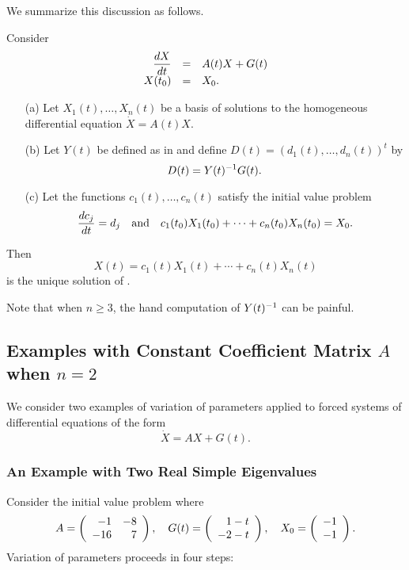 \documentclass{ximera}
\begin{document}
We summarize this discussion as follows. 
\begin{thm} \label{thm:varparsys}
Consider 
\begin{equation}  \label{eq:VPS}
\begin{array}{rcl}
\displaystyle \frac{dX}{dt} & = & A(t)X+G(t)\\
X(t_0) & = & X_0.
\end{array}
\end{equation}
\begin{itemize}
\item[(a)]  Let $X_1(t),\ldots,X_n(t)$ be a 
basis of solutions to 
the homogeneous differential equation $\dot{X}=A(t)X$.  
\item[(b)]  Let $Y(t)$ be defined as in  and define 
$D(t)=(d_1(t),\ldots,d_n(t))^t$ by 
\begin{equation}  \label{e:D(t)}
D(t) = Y(t)^{-1} G(t).
\end{equation}
\item[(c)]  Let the functions $c_1(t),\ldots,c_n(t)$ satisfy the initial 
value problem 
\begin{equation}  \label{eq:cj0}
\frac{dc_j}{dt}=d_j \quad\mbox{and}\quad  c_1(t_0)X_1(t_0) + \cdots +c_n(t_0)X_n(t_0) = X_0.
\end{equation}
\end{itemize}
Then
\[
X(t) =  c_1(t)X_1(t) + \cdots + c_n(t)X_n(t)
\]
is the unique solution of .
\end{thm}

Note that when $n\ge 3$, the hand computation of $Y(t)^{-1}$ can be  
painful.

\subsection*{Examples with Constant Coefficient Matrix $A$ when $n=2$}

We consider two examples of variation of parameters applied to 
forced systems of differential equations of the form 
\[
\dot{X} = AX + G(t).
\]

\subsubsection*{An Example with Two Real Simple Eigenvalues}

Consider the initial value problem  where
\begin{equation}  \label{eq:exinhom2}
A=\left(\begin{array}{rr} -1 & -8\\ -16 &7\end{array}\right), \quad G(t)= \left(\begin{array}{r} 1-t \\ -2-t\end{array}\right), \quad 
X_0 =  \left(\begin{array}{r} -1 \\ -1\end{array}\right).
\end{equation}
Variation of parameters proceeds in four steps:
\end{document}
